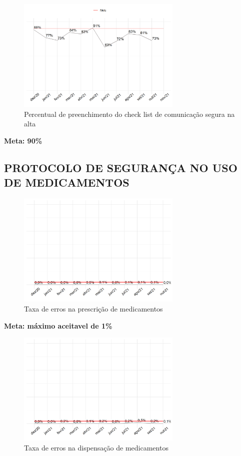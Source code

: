 \documentclass[
  a4paper]{article}
\begin{document}
\begin{figure}[H]
\caption{Percentual de preenchimento do check list de comunicação segura na alta}
\includegraphics[width=0.7\textwidth]{Imagens/check_alta.png}
\end{figure}

\begin{center}
 \textbf{Meta: 90\%}
\end{center}

\newpage

\subsection{PROTOCOLO DE SEGURANÇA NO USO DE MEDICAMENTOS}

\begin{figure}[H]
\caption{Taxa de erros na prescrição de medicamentos}
\includegraphics[width=0.7\textwidth]{Imagens/med_prescritos.png}
\end{figure}

\begin{center}
 \textbf{Meta: máximo aceitavel de 1\%}
\end{center}

\begin{figure}[H]
\caption{Taxa de erros na dispensação de medicamentos}
\includegraphics[width=0.7\textwidth]{Imagens/med_dispensados.png}
\end{figure}
\end{document}
